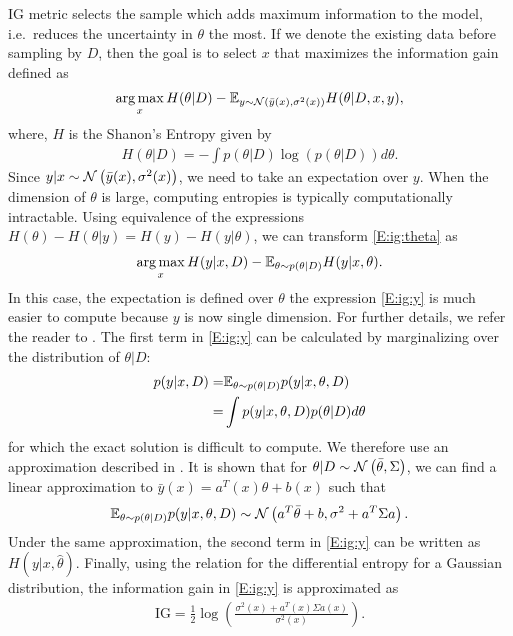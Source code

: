 IG metric selects the sample which adds maximum information to the model, i.e.~reduces the uncertainty in \(\theta\) the most. If we denote the existing data before sampling by \(D\), then the goal is to select \(x\) that maximizes the information gain defined as
\begin{align}
\argmax_x H(\theta|D) - \EE_{y \sim \GaussianDist{\bar{y}(x)}{\sigma^2(x)}}H(\theta|D,x,y),
\label{E:ig:theta}
\end{align}
where, \(H\) is the Shanon's Entropy given by
\begin{align}
H(\theta|D) = -\int p(\theta|D) \log (p(\theta|D))d\theta.
\end{align}
Since \(y|x \sim \operatorname*{\mathcal{N}}\left(\bar{y}(x), \sigma^2(x)\right)\), we need to take an expectation over \(y\). When the dimension of \(\theta\) is large, computing entropies is typically computationally intractable. Using equivalence of the expressions \(H(\theta) - H(\theta|y) = H(y) - H(y|\theta)\),
we can transform \eqref{E:ig:theta} as
\begin{align}
\argmax_x H(y|x,D) - \EE_{\theta \sim p(\theta|D)}H(y|x,\theta).
\label{E:ig:y}
\end{align}
In this case, the expectation is defined over \(\theta\) the expression \eqref{E:ig:y} is much easier to compute because \(y\) is now single dimension. For further details, we refer the reader to \cite{Houlsby2011}.
The first term in \eqref{E:ig:y} can be calculated by marginalizing over the distribution of \(\theta|D\):
\begin{align}
p(y|x,D) =& \mathbb{E}_{\theta \sim p(\theta|D)}p(y|x,\theta,D) \nonumber\\
=& \int p(y|x,\theta, D)p(\theta|D)d\theta
\end{align}
for which the exact solution is difficult to compute. We therefore use an approximation described in \cite{Garnett2013}. It is shown that for \(\theta|D \sim \operatorname*{\mathcal{N}}\left(\bar{\theta}, \Sigma\right)\), we can find a linear approximation to \(\bar{y}(x) = a^T(x)\theta+b(x)\) such that
\begin{align}
\mathbb{E}_{\theta \sim p(\theta|D)}p(y|x,\theta,D) \sim \operatorname*{\mathcal{N}}\left(a^T\bar{\theta}+b, \sigma^2+a^T\Sigma a\right).
\end{align}
Under the same approximation, the second term in \eqref{E:ig:y} can be written as \(H(y|x,\hat{\theta})\). 
Finally, using the relation for the differential entropy for a Gaussian distribution, the information gain in \eqref{E:ig:y} is approximated as
\begin{align}
\text{IG} = \frac{1}{2}\log\left(\frac{\sigma^2(x)+a^T(x)\Sigma a(x)}{\sigma^2(x)}\right).
\end{align}


